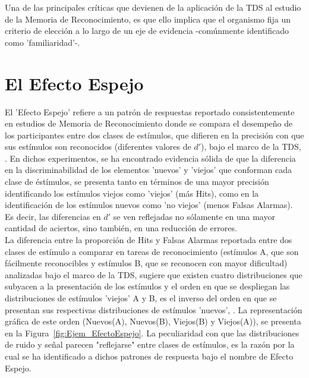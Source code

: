 Una de las principales críticas que devienen de la aplicación de la TDS al estudio de la Memoria de Reconocimiento, es que ello implica que el organismo fija un criterio de elección a lo largo de un eje de evidencia -comúnmente identificado como 'familiaridad'-.   \parencite{Brown1977}

























\section{El Efecto Espejo}

El 'Efecto Espejo' refiere a un patrón de respuestas reportado consistentemente en estudios de Memoria de Reconocimiento donde se compara el desempeño de los participantes entre dos clases de estímulos, que difieren en la precisión con que sus estímulos son reconocidos (diferentes valores de $d'$), bajo el marco de la TDS, \parencite{Glanzer1993}. En dichos experimentos, se ha encontrado evidencia sólida de que la diferencia en la discriminabilidad de los elementos 'nuevos' y 'viejos' que conforman cada clase de éstímulos, se presenta tanto en términos de una mayor precisión identificando los estímulos viejos como 'viejos' (más Hits), como en la identificación de los estímulos nuevos como 'no viejos' (menos Falsas Alarmas). Es decir, las diferencias en $d'$ se ven reflejadas no sólamente en una mayor cantidad de aciertos, sino también, en una reducción de errores.\\

La diferencia entre la proporción de Hits y Falsas Alarmas reportada entre dos clases de estímulo a comparar en tareas de reconocimiento (estímulos A, que son fácilmente reconocibles y estímulos B, que se reconocen con mayor dificultad) analizadas bajo el marco de la TDS, sugiere que existen cuatro distribuciones que subyacen a la presentación de los estímulos y el orden en que se despliegan las distribuciones de estímulos 'viejos' A y B, es el inverso del orden en que se presentan sus respectivas distribuciones de estímulos 'nuevos', \parencite{Glanzer1990, DeCarlo2007}. La representación gráfica de este orden (Nuevos(A), Nuevos(B), Viejos(B) y Viejos(A)), se presenta en la Figura~\ref{fig:Ejem_EfectoEspejo}. La peculiaridad con que las distribuciones de ruido y señal parecen "reflejarse" entre clases de estímulos, es la razón por la cual se ha identificado a dichos patrones de respuesta bajo el nombre de Efecto Espejo.\\

